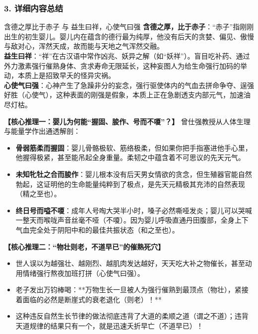 \subsubsection{3. 详细内容总结}

\begin{ConceptBox}{含德之厚比于赤子 与 益生曰祥，心使气曰强}
\textbf{含德之厚，比于赤子}：“赤子”指刚刚出生的初生婴儿。婴儿内在蕴含的德行最为纯厚，他没有后天的贪婪、偏见、傲慢与敌对心，浑然天成，故而能与天地之气浑然交融。\\
\textbf{益生曰祥}：“祥”在古汉语中常作凶兆、妖异之解（如“妖祥”）。盲目吃补药、通过外力激素强行催熟身体、贪求寿命无限延长，这种妄图人为给生命强行加码的举动，本质上是招致早夭的怪异灾祸。\\
\textbf{心使气曰强}：心神产生了急躁非分的妄念，强行驱使体内的气血去拼命争夺、逞强好胜（心使气），这种表面的刚强是假象，本质上正在急剧透支内部元气，加速油尽灯枯。
\end{ConceptBox}

\noindent\textbf{【核心推理一：婴儿为何能“握固、朘作、号而不嗄”？】}
曾仕强教授从人体生理与能量学作出通透解剖：
\begin{itemize}
    \item \textbf{骨弱筋柔而握固}：婴儿骨骼极软、筋络极柔，但如果你把手指塞进他手心里，他握得极紧，甚至能吊起全身重量。柔韧之中蕴含着不可思议的先天元气。
    \item \textbf{未知牝牡之合而朘作}：婴儿根本没有后天男女情欲的贪念，但生殖器官能自然勃起，这证明他的生命能量纯粹到了极点，是先天元精极其充沛的自然表现（精之至也）。
    \item \textbf{终日号而嗌不嗄}：成年人号啕大哭半小时，嗓子必然嘶哑发炎；婴儿可以哭喊一整天而喉咙声音丝毫不哑（不嗄）。因为婴儿呼吸直通丹田腹部，全身上下气血完全处于阴阳中和的最佳共振状态（和之至也）。
\end{itemize}

\noindent\textbf{【核心推理二：“物壮则老，不道早已”的催熟死穴】}
\begin{itemize}
    \item 世人误以为越强壮、越刚烈、越肌肉发达越好，天天吃大补之物催长，甚至动用情绪强行熬夜加班打拼（心使气曰强）。
    \item 老子发出万钧棒喝：**万物生长一旦被人为强行催熟到最顶点（物壮），紧接着面临的必然是断崖式的衰老退化（则老）！**
    \item 这种违反自然生长节律的做法彻底违背了大道的柔顺之道（谓之不道）；违背天道规律的结果只有一个，就是迅速夭折早亡（不道早已）！
\end{itemize}


